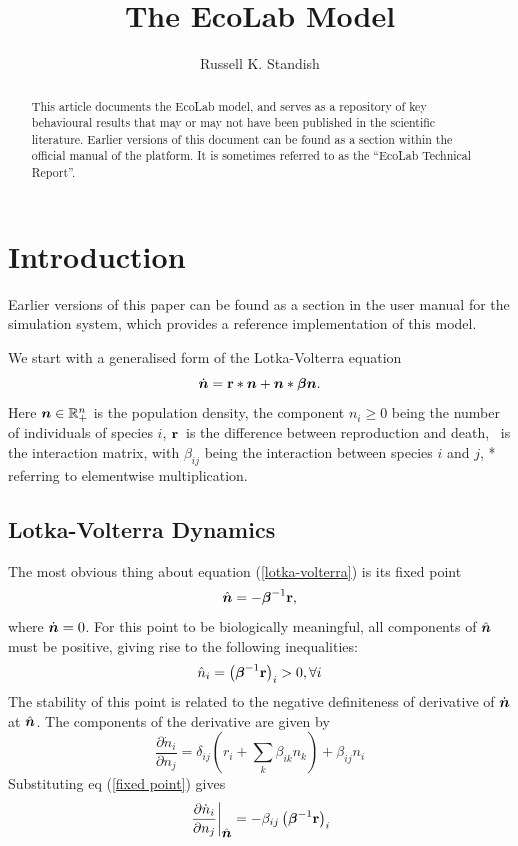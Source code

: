\documentclass{article}
\title{The EcoLab Model}
\author{Russell K. Standish}
\newcommand{\br}{\mbox{${\bf r}$}} %
\newcommand{\bbeta}{\mbox{\boldmath{$\beta$}}}   %
\newcommand{\bn}{\mbox{\boldmath{$n$}}}          %
\providecommand{\reals}{\mathbb{R}}
\newcommand{\EcoLab}{{\sffamily\slshape
    \mbox{\raisebox{.5ex}{Eco}\hspace{-.4em}{\makebox[.5em]{L}ab}}}}
\begin{document}
\maketitle

\begin{abstract}
  This article documents the EcoLab model, and serves as a repository
  of key behavioural results that may or may not have been published
  in the scientific literature. Earlier versions of this document can
  be found as a section within the official manual of the \EcoLab{}
  platform. It is sometimes referred to as the ``EcoLab Technical Report''.
\end{abstract}

\section{Introduction}

Earlier versions of this paper can be found as a section in the user
manual for the \EcoLab{} simulation system, which provides a reference
implementation of this model.

We start with a generalised form of the Lotka-Volterra equation 
\begin{equation}\label{lotka-volterra}
\dot{\bn} = \br*\bn + \bn*\bbeta\bn.
\end{equation}
Here $\bn\in\reals^n_+$ is the population density, the component
$n_i\ge0$ being the number of individuals of species $i$, \br\ is the
difference between reproduction and death, \bbeta\ is the interaction
matrix, with $\beta_{ij}$ being the interaction between species $i$
and $j$, * referring to elementwise multiplication.

\subsection{Lotka-Volterra Dynamics}

The most obvious thing about equation (\ref{lotka-volterra}) is its
fixed point 
\begin{equation}\label{fixed point}
\hat{\bn} = -\bbeta^{-1}\br,
\end{equation}
where $\dot{\bn}=0$. For this point to be biologically meaningful, all
components of $\hat{\bn}$ must be positive, giving rise to the following
inequalities:
\begin{equation}\label{positive species}
\hat n_i = \left(\bbeta^{-1}\br\right)_i>0, \forall i
\end{equation}
The stability of this point is related to the
negative definiteness of derivative of $\dot{\bn}$ at $\hat{\bn}$. The
components of the derivative are given by
\begin{equation}\label{derivative}
\frac{\partial\dot{n}_i}{\partial n_j} =
\delta_{ij}\left(r_i+\sum_k\beta_{ik}n_k\right) + \beta_{ij}n_i
\end{equation}
Substituting eq (\ref{fixed point}) gives
\begin{equation}
\left.\frac{\partial\dot{n}_i}{\partial n_j}\right|_{\hat{\bn}}=
-\beta_{ij}\left(\bbeta^{-1}\br\right)_i
\end{equation}
\end{document}
